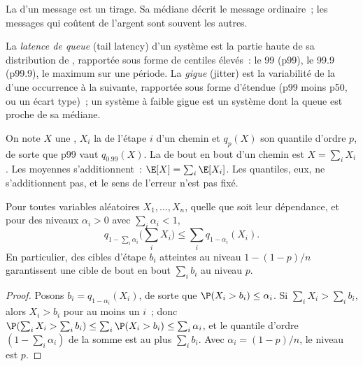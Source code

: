 La  d'un message est un tirage. Sa médiane décrit le message ordinaire~;
les messages qui coûtent de l'argent sont souvent les autres.

\begin{definition}\label{def:ll:where-latency-comes-from:tail}
La \emph{latence de queue} (tail latency) d'un système est la partie haute de sa distribution de , rapportée
sous forme de centiles élevés~: le 99 (p99), le 99.9 (p99.9), le maximum sur une période. La \emph{gigue} (jitter) est la variabilité
de la  d'une occurrence à la suivante, rapportée sous forme d'étendue (p99 moins p50, ou un écart type)~; un système à faible gigue
est un système dont la queue est proche de sa médiane.
\end{definition}

On note $X$ une , $X_i$ la  de l'étape $i$ d'un chemin et $q_p(X)$ son quantile d'ordre $p$, de sorte que
p99 vaut $q_{0.99}(X)$. La  de bout en bout d'un chemin est $X = \sum_i X_i$. Les moyennes s'additionnent~: $\E[X] = \sum_i \E[X_i]$.
Les quantiles, eux, ne s'additionnent pas, et le sens de l'erreur n'est pas fixé.

\begin{proposition}\label{prop:ll:where-latency-comes-from:union}
Pour toutes variables aléatoires $X_1,\dots,X_n$, quelle que soit leur dépendance, et pour des niveaux $\alpha_i > 0$ avec $\sum_i \alpha_i < 1$,
\[
q_{1-\sum_i \alpha_i}\Big(\sum_i X_i\Big) \le \sum_i q_{1-\alpha_i}(X_i).
\]
En particulier, des cibles d'étape $b_i$ atteintes au niveau $1-(1-p)/n$ garantissent une cible de bout en bout $\sum_i b_i$ au
niveau $p$.
\end{proposition}

\begin{proof}
Posons $b_i = q_{1-\alpha_i}(X_i)$, de sorte que $\P(X_i > b_i) \le \alpha_i$. Si $\sum_i X_i > \sum_i b_i$, alors $X_i > b_i$ pour
au moins un $i$~; donc $\P(\sum_i X_i > \sum_i b_i) \le \sum_i \P(X_i > b_i) \le \sum_i \alpha_i$, et le quantile d'ordre
$(1-\sum_i\alpha_i)$ de la somme est au plus $\sum_i b_i$. Avec $\alpha_i = (1-p)/n$, le niveau est $p$.
\end{proof}

